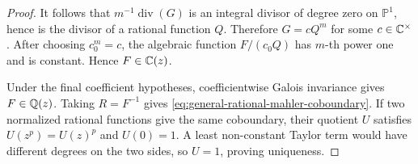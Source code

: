 \begin{proof}
It follows that \(m^{-1}\operatorname{div}(G)\) is an integral divisor of
degree zero on \(\mathbb P^1\), hence is the divisor of a rational function
\(Q\).  Therefore \(G=cQ^m\) for some \(c\in\mathbb{C}^\times\).  After choosing
\(c_0^m=c\), the algebraic function \(F/(c_0Q)\) has \(m\)-th power one and
is constant.  Hence \(F\in\mathbb{C}(z)\).

Under the final coefficient hypotheses, coefficientwise Galois invariance
gives \(F\in\mathbb{Q}(z)\).  Taking \(R=F^{-1}\) gives
\eqref{eq:general-rational-mahler-coboundary}.  If two normalized rational
functions give the same coboundary, their quotient \(U\) satisfies
\(U(z^p)=U(z)^p\) and \(U(0)=1\).  A least non-constant Taylor term would
have different degrees on the two sides, so \(U=1\), proving uniqueness.
\end{proof}
